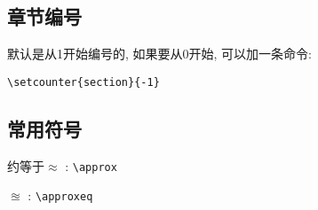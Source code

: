\subsection{章节编号}
默认是从1开始编号的, 如果要从0开始, 可以加一条命令: \begin{verbatim}\setcounter{section}{-1}\end{verbatim}


\subsection{常用符号}
\begin{myitemize}
	\item 约等于$\approx$ : \verb|\approx|
	\item $\approxeq$ : \verb|\approxeq|
\end{myitemize}






